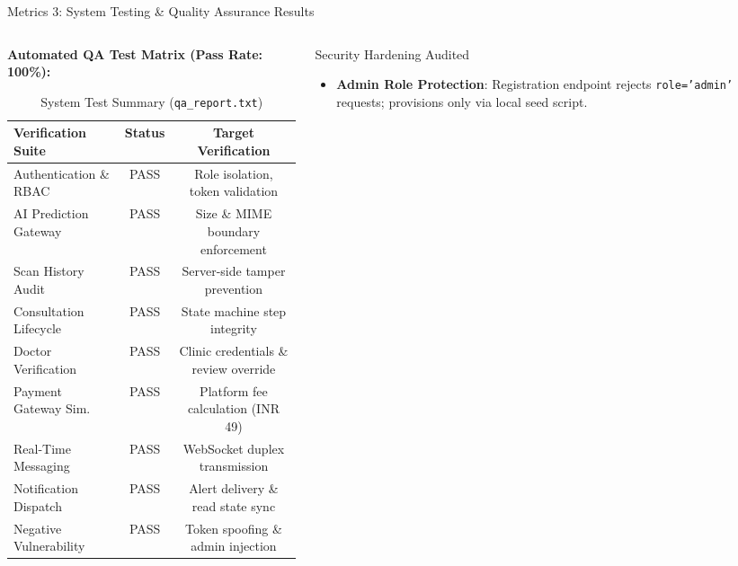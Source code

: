 \documentclass[aspectratio=169, 10pt]{beamer}
\begin{document}
\begin{frame}{Metrics 3: System Testing \& Quality Assurance Results}
\begin{columns}[T]
    \begin{column}{0.50\textwidth}
        \textbf{Automated QA Test Matrix (Pass Rate: 100\%):}
        \begin{table}[H]
        \centering
        \scriptsize
        \begin{tabular}{@{}lcc@{}}
        \toprule
        \textbf{Verification Suite} & \textbf{Status} & \textbf{Target Verification} \\ \midrule
        Authentication \& RBAC & PASS & Role isolation, token validation \\
        AI Prediction Gateway & PASS & Size \& MIME boundary enforcement \\
        Scan History Audit & PASS & Server-side tamper prevention \\
        Consultation Lifecycle & PASS & State machine step integrity \\
        Doctor Verification & PASS & Clinic credentials \& review override \\
        Payment Gateway Sim. & PASS & Platform fee calculation (INR 49) \\
        Real-Time Messaging & PASS & WebSocket duplex transmission \\
        Notification Dispatch & PASS & Alert delivery \& read state sync \\
        Negative Vulnerability & PASS & Token spoofing \& admin injection \\ \bottomrule
        \end{tabular}
        \caption{System Test Summary (\texttt{qa\_report.txt})}
        \end{table}
    \end{column}
    \begin{column}{0.50\textwidth}
        \begin{alertblock}{Security Hardening Audited}
            \scriptsize
            \begin{itemize}
                \item \textbf{Admin Role Protection}: Registration endpoint rejects \texttt{role='admin'} requests; provisions only via local seed script.

\end{itemize}
\end{alertblock}
\end{column}
\end{columns}
\end{frame}
\end{document}
